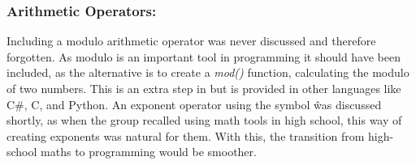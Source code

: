\subsubsection{Arithmetic Operators:} Including a modulo arithmetic operator was never discussed and therefore forgotten. As modulo is an important tool in programming it should have been included, as the alternative is to create a \textit{mod()} function, calculating the modulo of two numbers. This is an extra step in \lang but is provided in other languages like C\#, C, and Python. An exponent operator using the symbol \^ was discussed shortly, as when the group recalled using math tools in high school, this way of creating exponents was natural for them. With this, the transition from high-school maths to programming would be smoother. 